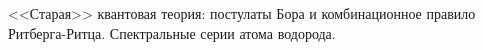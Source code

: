 \documentclass[__main__.tex]{subfiles}
\begin{document}
<<Старая>> квантовая теория: постулаты Бора и комбинационное правило Ритберга-Ритца. Спектральные серии атома водорода.\\ 

\end{document}
